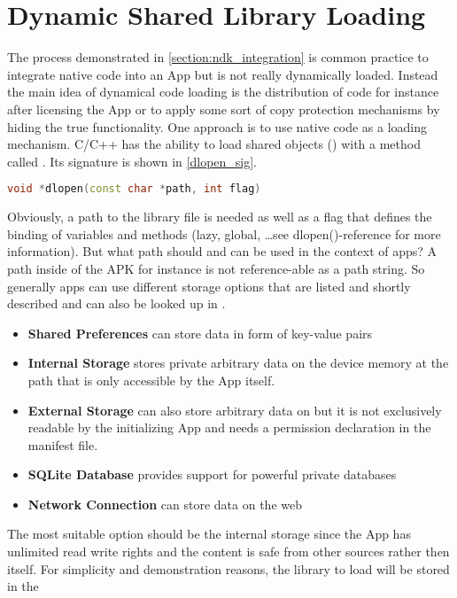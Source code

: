 \section{Dynamic Shared Library Loading}\label{section:shared_library_loading}
The process demonstrated in \autoref{section:ndk_integration} is common practice to 
integrate native code into an App but is not really dynamically loaded. Instead
the main idea of dynamical code loading is the distribution of code for instance
after licensing the App or to apply some sort of copy protection mechanisms by hiding
the true functionality. One approach is to use native code as a loading mechanism.
C/C++ has the ability to load shared objects () with a method called
. Its signature is shown in \autoref{dlopen_sig}.
\begin{lstlisting}[language=C++, caption=dlopen() Signature, label=dlopen_sig]
void *dlopen(const char *path, int flag)
\end{lstlisting}
Obviously, a path to the library file is needed as well as a flag that defines the binding of variables and methods (lazy, global, \ldots see dlopen()-reference for more information).
But what path should and can be used in the context of apps? A path inside of the APK
for instance is not reference-able as a path string. So generally apps can use different storage options that are listed and shortly described and can also be looked up in
\parencite{storage_options}.
\begin{itemize}
\item \textbf{Shared Preferences} can store data in form of key-value pairs
\item \textbf{Internal Storage} stores private arbitrary data on the device memory at the path
  that is only accessible by the App itself.
\item \textbf{External Storage} can also store arbitrary data on  but it is not exclusively readable by the initializing App and needs a permission declaration in
the manifest file.
\item \textbf{SQLite Database} provides support for powerful private databases
\item \textbf{Network Connection} can store data on the web 
\end{itemize}
The most suitable option should be the internal storage since the App has unlimited read
write rights and the content is safe from other sources rather then itself. For simplicity and demonstration reasons, the library to load will be stored in the
